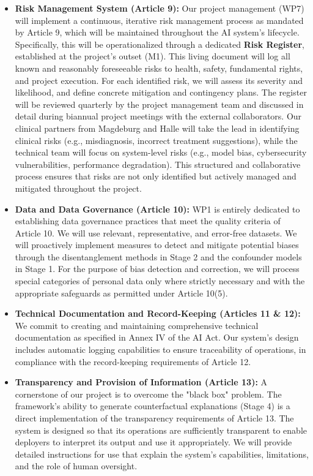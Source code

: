 \documentclass[11pt, a4paper]{article}
\begin{document}
\begin{itemize}
    \item \textbf{Risk Management System (Article 9):} Our project management (WP7) will implement a continuous, iterative risk management process as mandated by Article 9, which will be maintained throughout the AI system’s lifecycle. Specifically, this will be operationalized through a dedicated \textbf{Risk Register}, established at the project's outset (M1). This living document will log all known and reasonably foreseeable risks to health, safety, fundamental rights, and project execution. For each identified risk, we will assess its severity and likelihood, and define concrete mitigation and contingency plans. The register will be reviewed quarterly by the project management team and discussed in detail during biannual project meetings with the external collaborators. Our clinical partners from Magdeburg and Halle will take the lead in identifying clinical risks (e.g., misdiagnosis, incorrect treatment suggestions), while the technical team will focus on system-level risks (e.g., model bias, cybersecurity vulnerabilities, performance degradation). This structured and collaborative process ensures that risks are not only identified but actively managed and mitigated throughout the project.

    \item \textbf{Data and Data Governance (Article 10):} WP1 is entirely dedicated to establishing data governance practices that meet the quality criteria of Article 10. We will use relevant, representative, and error-free datasets. We will proactively implement measures to detect and mitigate potential biases through the disentanglement methods in Stage 2 and the confounder models in Stage 1. For the purpose of bias detection and correction, we will process special categories of personal data only where strictly necessary and with the appropriate safeguards as permitted under Article 10(5).

    \item \textbf{Technical Documentation and Record-Keeping (Articles 11 \& 12):} We commit to creating and maintaining comprehensive technical documentation as specified in Annex IV of the AI Act. Our system's design includes automatic logging capabilities to ensure traceability of operations, in compliance with the record-keeping requirements of Article 12.

    \item \textbf{Transparency and Provision of Information (Article 13):} A cornerstone of our project is to overcome the "black box" problem. The framework's ability to generate counterfactual explanations (Stage 4) is a direct implementation of the transparency requirements of Article 13. The system is designed so that its operations are sufficiently transparent to enable deployers to interpret its output and use it appropriately. We will provide detailed instructions for use that explain the system's capabilities, limitations, and the role of human oversight.


\end{itemize}
\end{document}
